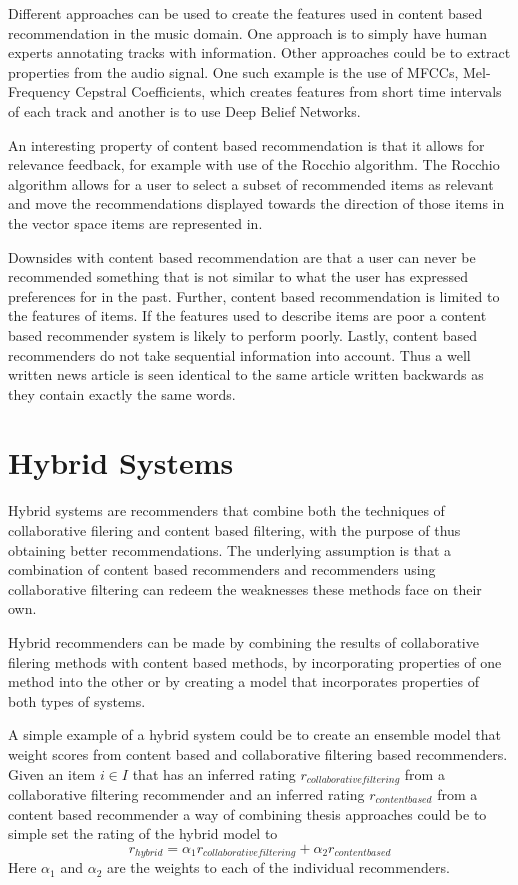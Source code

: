 \documentclass[a4paper,11pt]{kth-mag}
\begin{document}
Different approaches can be used to create the features used in content based recommendation in the music domain. One approach is to simply have human experts annotating tracks with information\cite{musicGenome}\cite{tzanetakis2002musical}. Other approaches could be to extract properties from the audio signal. One such example is the use of MFCCs, Mel-Frequency Cepstral Coefficients, which creates features from short time intervals of each track\cite{logan2000mel} and another is to use Deep Belief Networks\cite{hamel2010learning}.

An interesting property of content based recommendation is that it allows for relevance feedback, for example with use of the Rocchio algorithm. The Rocchio algorithm allows for a user to select a subset of recommended items as relevant and move the recommendations displayed towards the direction of those items in the vector space items are represented in\cite{pazzani2007content}.

Downsides with content based recommendation are that a user can never be recommended something that is not similar to what the user has expressed preferences for in the past. Further, content based recommendation is limited to the features of items. If the features used to describe items are poor a content based recommender system is likely to perform poorly. Lastly, content based recommenders do not take sequential information into account. Thus a well written news article is seen identical to the same article written backwards as they contain exactly the same words\cite{adomavicius2005toward}.

\section{Hybrid Systems}
Hybrid systems are recommenders that combine both the techniques of collaborative filering and content based filtering, with the purpose of thus obtaining better recommendations. The underlying assumption is that a combination of content based recommenders and recommenders using collaborative filtering can redeem the weaknesses these methods face on their own\cite{gunawardana2009unified}. 

Hybrid recommenders can be made by combining the results of collaborative filering methods with content based methods, by incorporating properties of one method into the other or by creating a model that incorporates properties of both types of systems\cite{adomavicius2005toward}. 

A simple example of a hybrid system could be to create an ensemble model that weight scores from content based and collaborative filtering based recommenders. Given an item $i \in I$ that has an inferred rating $r_{collaborative filtering}$ from a collaborative filtering recommender and an inferred rating $r_{content based}$ from a content based recommender a way of combining thesis approaches could be to simple set the rating of the hybrid model to \[ r_{hybrid} = \alpha_1 r_{collaborative filtering} + \alpha_2 r_{content based}\] Here $\alpha_1$ and $\alpha_2$ are the weights to each of the individual recommenders.
\end{document}
